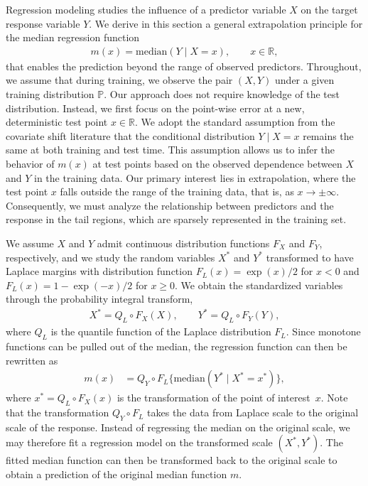 \documentclass{statsoc}
\theoremstyle{break}
\newcommand{\Ptr}{\mathbb P}
\def\M{\text{median}}
\newcommand{\beam}{\begin{eqnarray}}
\newcommand{\eeam}{\end{eqnarray}\noindent}
\begin{document}
Regression modeling studies the influence of a predictor variable $X$ on the target response variable $Y$. We derive in this section a general extrapolation principle for the median regression function
\beam \label{eq:ocnd:median} 
	m(x) = \M(Y \mid X = x), \qquad x\in\mathbb R,
\eeam 
that enables the prediction beyond the range of observed predictors.
Throughout, we assume that during training, we observe the pair $(X,Y)$ under a given training distribution $\Ptr$. Our approach does not require knowledge of the test distribution. Instead, we first focus on the point-wise error at a new, deterministic test point $x\in\mathbb R$. We adopt the standard assumption from the covariate shift literature that the conditional distribution $Y\mid X=x$ remains the same at both training and test time.
This assumption allows us to infer the behavior of $m(x)$ at test points based on the observed dependence between $X$ and $Y$ in the training data.  
Our primary interest lies in extrapolation, where the test point $x$ falls outside the range of the training data, that is, as $x \to \pm \infty$. Consequently, we must analyze the relationship between predictors and the response in the tail regions, which are sparsely represented in the training set.


We assume $X$ and $Y$ admit continuous distribution functions $F_X$ and $F_Y$, respectively, and we study the random variables $X^*$ and $Y^*$ transformed to have Laplace margins with distribution function $F_L(x) = \exp(x)/2$ for $x<0$ and $F_L(x) = 1 - \exp(-x)/2$ for $x\geq 0$. 
  We obtain the standardized variables through the probability integral transform,
\begin{align} \label{eq:laplace:trans}
X^* = Q_L \circ F_X(X), \qquad Y^* = Q_L \circ F_Y(Y),
\end{align}
where $Q_L$ is the quantile function of the Laplace
distribution $F_L$. Since monotone functions can be pulled out of the median, the regression function can then be rewritten as
\begin{align}\label{f_rewritten} 
	m(x) 
	&= Q_Y \circ F_L\{ \text{median}(Y^* \mid X^* = x^* ) \}, 
\end{align}
where $x^*= Q_L \circ F_X(x)$ is the transformation of the point of interest~$x$. Note that the transformation $Q_Y \circ F_L$ takes the data from Laplace scale to the original scale of the response.
Instead of regressing the median on the original scale, we may therefore fit a regression model on the transformed scale $(X^*, Y^*)$. 
The fitted median function can then be transformed back to the original scale to obtain a prediction of the original median function $m$.
\end{document}
